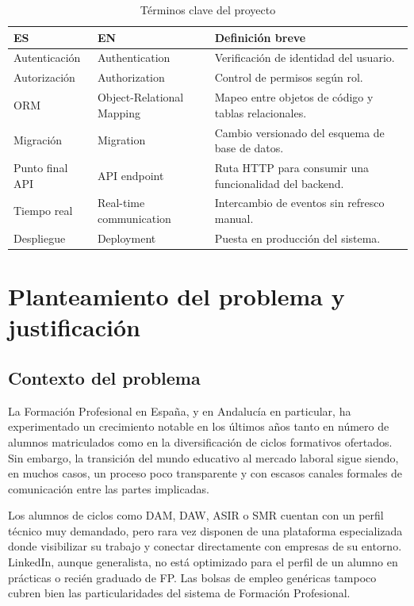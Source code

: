 \documentclass[12pt, a4paper]{report}
\begin{document}
\begin{table}[H]
  \centering
  \caption{Términos clave del proyecto}
  \begin{tabularx}{\textwidth}{lXX}
    \toprule
    \textbf{ES} & \textbf{EN} & \textbf{Definición breve} \\
    \midrule
    Autenticación & Authentication & Verificación de identidad del usuario. \\
    Autorización & Authorization & Control de permisos según rol. \\
    ORM & Object-Relational Mapping & Mapeo entre objetos de código y tablas relacionales. \\
    Migración & Migration & Cambio versionado del esquema de base de datos. \\
    Punto final API & API endpoint & Ruta HTTP para consumir una funcionalidad del backend. \\
    Tiempo real & Real-time communication & Intercambio de eventos sin refresco manual. \\
    Despliegue & Deployment & Puesta en producción del sistema. \\
    \bottomrule
  \end{tabularx}
\end{table}

\chapter{Planteamiento del problema y justificación}

\section{Contexto del problema}

La Formación Profesional en España, y en Andalucía en particular, ha experimentado un crecimiento
notable en los últimos años tanto en número de alumnos matriculados como en la diversificación de
ciclos formativos ofertados. Sin embargo, la transición del mundo educativo al mercado laboral sigue
siendo, en muchos casos, un proceso poco transparente y con escasos canales formales de comunicación
entre las partes implicadas.

Los alumnos de ciclos como DAM, DAW, ASIR o SMR cuentan con un perfil técnico muy demandado, pero
rara vez disponen de una plataforma especializada donde visibilizar su trabajo y conectar directamente
con empresas de su entorno. LinkedIn, aunque generalista, no está optimizado para el perfil de un
alumno en prácticas o recién graduado de FP. Las bolsas de empleo genéricas tampoco cubren bien
las particularidades del sistema de Formación Profesional.
\end{document}
